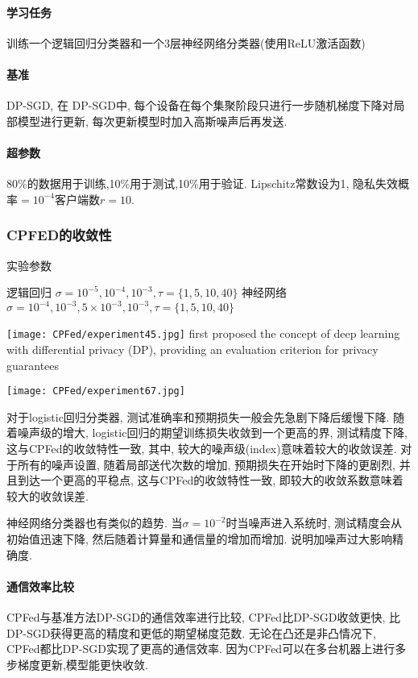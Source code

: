 \paragraph{学习任务} 训练一个逻辑回归分类器和一个3层神经网络分类器(使用ReLU激活函数)

\paragraph{基准} DP-SGD, 在 DP-SGD中, 每个设备在每个集聚阶段只进行一步随机梯度下降对局部模型进行更新, 每次更新模型时加入高斯噪声后再发送. 

\paragraph{超参数} 80\%的数据用于训练,10\%用于测试,10\%用于验证. Lipschitz常数设为1, 隐私失效概率$=10^{-4} $客户端数$r=10$.

\subsubsection{CPFED的收敛性}
实验参数

逻辑回归
$ \sigma = {10^{-5},10^{-4},10^{-3}}, \tau=\{1,5,10,40\}$
神经网络 
$ \sigma = {10^{-4},10^{-3},5 \times 10^{-3},10^{-3}}, \tau=\{1,5,10,40\}$

\begin{figure*}[!ht]
    \setlength{\abovecaptionskip}{0.1cm}
    \centering    
    \texttt{[image: CPFed/experiment45.jpg]} first proposed the concept of deep learning with differential privacy (DP), providing an evaluation criterion for privacy guarantees
\end{figure*}

\begin{figure*}[!ht]
    \setlength{\abovecaptionskip}{0.1cm}
    \centering    
    \texttt{[image: CPFed/experiment67.jpg]}
\end{figure*}

对于logistic回归分类器, 测试准确率和预期损失一般会先急剧下降后缓慢下降. 随着噪声级的增大, logistic回归的期望训练损失收敛到一个更高的界, 测试精度下降, 这与CPFed的收敛特性一致, 其中, 较大的噪声级(index)意味着较大的收敛误差. 对于所有的噪声设置, 随着局部送代次数的增加, 预期损失在开始时下降的更剧烈, 并且到达一个更高的平稳点, 这与CPFed的收敛特性一致, 即较大的收敛系数意味着较大的收敛误差. 

神经网络分类器也有类似的趋势. 当$\sigma=10^{-2}$时当噪声进入系统时, 测试精度会从初始值迅速下降, 然后随着计算量和通信量的增加而增加. 说明加噪声过大影响精确度.

\paragraph{通信效率比较} CPFed与基准方法DP-SGD的通信效率进行比较, CPFed比DP-SGD收敛更快, 比DP-SGD获得更高的精度和更低的期望梯度范数. 无论在凸还是非凸情况下, CPFed都比DP-SGD实现了更高的通信效率. 因为CPFed可以在多台机器上进行多步梯度更新,模型能更快收敛.

